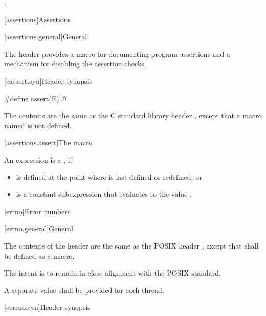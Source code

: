 \begin{itemdescr}
\pnum
\ensures
{}.
\end{itemdescr}

[assertions]{Assertions}

[assertions.general]{General}

\pnum
The header 
provides a macro for documenting \Cpp{} program assertions and a mechanism
for disabling the assertion checks.

[cassert.syn]{Header  synopsis}

%
\begin{codeblock}
#define assert(E) @\seebelow@
\end{codeblock}

\pnum
{}%
The contents are the same as the C standard library header
,
except that a macro named 
is not defined.


[assertions.assert]{The  macro}

\pnum
An expression 
is a , if
\begin{itemize}
\item
{} is defined at the point where 
is last defined or redefined, or
\item
{} 
is a constant subexpression that evaluates to the value .
\end{itemize}

[errno]{Error numbers}

[errno.general]{General}

\pnum
The contents of the header  are the same as the POSIX header
, except that  shall be defined as a macro.
\begin{note}
The intent is to remain in close alignment with the POSIX standard.
\end{note}
A separate  value shall be provided for each thread.

[cerrno.syn]{Header  synopsis}

